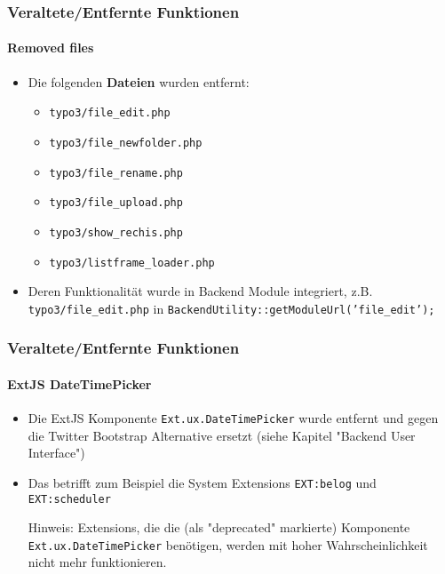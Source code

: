 \begin{frame}[fragile]
	\frametitle{Veraltete/Entfernte Funktionen}
	\framesubtitle{Removed files}

	\begin{itemize}
		\item Die folgenden \textbf{Dateien} wurden entfernt:

			\begin{itemize}
				\item \texttt{typo3/file\_edit.php}
				\item \texttt{typo3/file\_newfolder.php}
				\item \texttt{typo3/file\_rename.php}
				\item \texttt{typo3/file\_upload.php}
				\item \texttt{typo3/show\_rechis.php}
				\item \texttt{typo3/listframe\_loader.php}
			\end{itemize}

		\item Deren Funktionalität wurde in Backend Module integriert,
			z.B. \texttt{typo3/file\_edit.php} in \texttt{BackendUtility::getModuleUrl('file\_edit');}

	\end{itemize}

\end{frame}


\begin{frame}[fragile]
	\frametitle{Veraltete/Entfernte Funktionen}
	\framesubtitle{ExtJS DateTimePicker}

	\begin{itemize}

		\item Die ExtJS Komponente \texttt{Ext.ux.DateTimePicker} wurde entfernt und gegen
			die Twitter Bootstrap Alternative ersetzt (siehe Kapitel "Backend User Interface")

		\item Das betrifft zum Beispiel die System Extensions \texttt{EXT:belog} und \texttt{EXT:scheduler}

			\vspace{0.2cm}

			\begingroup
				\color{red}
					Hinweis: Extensions, die die (als "deprecated" markierte)
					Komponente \texttt{Ext.ux.DateTimePicker} benötigen, werden
					mit hoher Wahrscheinlichkeit nicht mehr funktionieren.
			\endgroup

	\end{itemize}

\end{frame}

